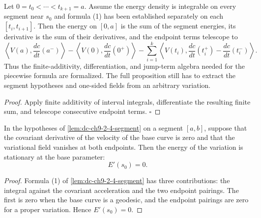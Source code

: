 \begin{lemma}
  \label{lem:dc-ch9-2-4-piecewise-assembly}
  \leanok
  Let $0=t_0<\cdots<t_{k+1}=a$. Assume the energy density is integrable on every
  segment near $s_0$ and formula (1) has been established separately on each
  $[t_i,t_{i+1}]$. Then the energy on $[0,a]$ is the sum of the segment energies, its
  derivative is the sum of their derivatives, and the endpoint terms telescope to
  $$
  \left\langle V(a),\frac{dc}{dt}(a^-)\right\rangle
  -\left\langle V(0),\frac{dc}{dt}(0^+)\right\rangle
  -\sum_{i=1}^k\left\langle V(t_i),
    \frac{dc}{dt}(t_i^+)-\frac{dc}{dt}(t_i^-)\right\rangle.
  $$
  Thus the finite-additivity, differentiation, and jump-term algebra needed for the
  piecewise formula are formalized. The full proposition still has to extract the
  segment hypotheses and one-sided fields from an arbitrary variation.
\end{lemma}
\begin{proof}
  \leanok
  Apply finite additivity of interval integrals, differentiate the resulting finite sum,
  and telescope consecutive endpoint terms. $\square$
\end{proof}

\begin{lemma}
  \label{lem:dc-ch9-2-5-geodesic-energy}
  \leanok
  In the hypotheses of \cref{lem:dc-ch9-2-4-segment} on a segment $[a,b]$, suppose that
  the covariant derivative of the velocity of the base curve is zero and that the
  variational field vanishes at both endpoints. Then the energy of the variation is
  stationary at the base parameter:
  $$
  E'(s_0)=0.
  $$
\end{lemma}
\begin{proof}
  \leanok
  Formula (1) of \cref{lem:dc-ch9-2-4-segment} has three contributions: the integral
  against the covariant acceleration and the two endpoint pairings. The first is zero
  when the base curve is a geodesic, and the endpoint pairings are zero for a proper
  variation. Hence $E'(s_0)=0$.
\end{proof}

